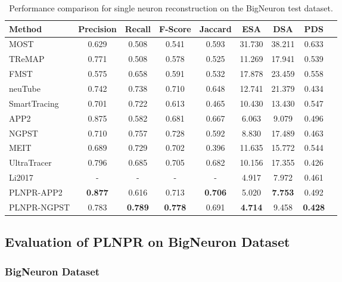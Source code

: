\begin{table}[h]
	\centering
	\makeatletter{}\makeatother
	\caption{Performance comparison for single neuron reconstruction on the BigNeuron test dataset.}
	\label{table:compare_BigNeuron}
	\begin{tabular}{lcccccccc}
		\toprule
		Method & Precision & Recall & F-Score & Jaccard & ESA & DSA & PDS\\
		\midrule
		MOST~\cite{Wu2014} & 0.629 & 0.508 & 0.541 & 0.593 & 31.730 & 38.211 & 0.633\\
		TReMAP~\cite{Zhou2016} & 0.771 & 0.508 & 0.578 & 0.525 & 11.269 & 17.941 & 0.539\\
		FMST~\cite{Yang2019} & 0.575 & 0.658 & 0.591 & 0.532 & 17.878 & 23.459 & 0.558\\
		neuTube~\cite{Feng2015} & 0.742&0.738&0.710&0.648&12.741&21.379&0.434&\\
		SmartTracing~\cite{Chen2015} & 0.701 & 0.722 & 0.613 & 0.465 & 10.430 & 13.430 & 0.547\\
		APP2~\cite{Xiao2013} & 0.875 & 	0.582 & 0.681 & 0.667 & 6.063 & 9.079 & 0.496\\
		NGPST~\cite{Quan2015} & 0.710 & 0.757 & 0.728 & 0.592 & 8.830 & 17.489 & 0.463\\
		MEIT~\cite{Wang2018} & 0.689  & 0.729 & 0.702 & 0.396 & 11.635 &15.772 & 0.544 \\
		UltraTracer~\cite{Peng2017} & 0.796 & 0.685 & 0.705 & 0.682 & 10.156 & 17.355 & 0.426 \\
		Li2017~\cite{Li2017} & - & - & - & - & 4.917 & 7.972 &0.461 \\
		\midrule
		PLNPR-APP2 & \textbf{0.877} & 0.616 & 0.713 & \textbf{0.706} & 5.020 & \textbf{7.753} & 0.492\\
		PLNPR-NGPST &0.783&\textbf{0.789}&\textbf{0.778}&0.691&\textbf{4.714}&9.458 & \textbf{0.428}\\
		\bottomrule
	\end{tabular}
\end{table}

\subsection{Evaluation of PLNPR on BigNeuron Dataset}
\label{sec:exp_PLNPR_BigNeuron}

\subsubsection{BigNeuron Dataset}

